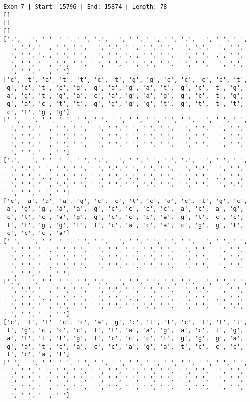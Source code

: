 \documentclass{article}
\begin{document}
\begin{Verbatim}
Exon 7 | Start: 15796 | End: 15874 | Length: 78
[]
[]
[]
['.', ' ', ' ', ' ', ' ', '.', ' ', ' ', ' ', ' ', '.', ' ', ' ', ' ', ' ', '.', ' ', ' ', ' ', ' ', '.', ' ', ' ', ' ', ' ', '.', ' ', ' ', ' ', ' ', '.', ' ', ' ', ' ', ' ', '.', ' ', ' ', ' ', ' ', '.', ' ', ' ', ' ', ' ', '.', ' ', ' ', ' ', ' ', '.', ' ', ' ', ' ', ' ', '.', ' ', ' ', ' ', ' ']
['c', 't', 'a', 't', 't', 'c', 't', 'g', 'g', 'c', 'c', 'c', 'c', 't', 'g', 'c', 't', 'c', 'g', 'g', 'a', 'g', 'a', 't', 'g', 'c', 't', 'g', 'a', 'g', 't', 'g', 'a', 'c', 'a', 'g', 'a', 'g', 'g', 'c', 't', 'g', 'g', 'a', 'c', 't', 't', 'g', 'g', 'g', 'g', 't', 'g', 't', 't', 't', 'c', 't', 'g', 'g']
[' ', ' ', ' ', ' ', ' ', ' ', ' ', ' ', ' ', ' ', ' ', ' ', ' ', ' ', ' ', ' ', ' ', ' ', ' ', ' ', ' ', ' ', ' ', ' ', ' ', ' ', ' ', ' ', ' ', ' ', ' ', ' ', ' ', ' ', ' ', ' ', ' ', ' ', ' ', ' ', ' ', ' ', ' ', ' ', ' ', ' ', ' ', ' ', ' ', ' ', ' ', ' ', ' ', ' ', ' ', ' ', ' ', ' ', ' ', ' ']
['.', ' ', ' ', ' ', ' ', '.', ' ', ' ', ' ', ' ', '.', ' ', ' ', ' ', ' ', '.', ' ', ' ', ' ', ' ', '.', ' ', ' ', ' ', ' ', '.', ' ', ' ', ' ', ' ', '.', ' ', ' ', ' ', ' ', '.', ' ', ' ', ' ', ' ', '.', ' ', ' ', ' ', ' ', '.', ' ', ' ', ' ', ' ', '.', ' ', ' ', ' ', ' ', '.', ' ', ' ', ' ', ' ']
['c', 'a', 'a', 'a', 'g', 'c', 'c', 't', 'c', 'a', 'c', 't', 'g', 'c', 'a', 'g', 'g', 'a', 'a', 'g', 'c', 'c', 'c', 'c', 'a', 'c', 'a', 'g', 'c', 't', 'c', 'a', 'g', 'g', 'c', 'c', 'c', 'a', 'g', 't', 'c', 'c', 't', 't', 'g', 'g', 't', 't', 'c', 'a', 'c', 'a', 'c', 'g', 'g', 't', 'c', 'c', 'c', 'a']
[' ', ' ', ' ', ' ', ' ', ' ', ' ', ' ', ' ', ' ', ' ', ' ', ' ', ' ', ' ', ' ', ' ', ' ', ' ', ' ', ' ', ' ', ' ', ' ', ' ', ' ', ' ', ' ', ' ', ' ', ' ', ' ', ' ', ' ', ' ', ' ', ' ', ' ', ' ', ' ', ' ', ' ', ' ', ' ', ' ', ' ', ' ', ' ', ' ', ' ', ' ', ' ', ' ', ' ', ' ', ' ', ' ', ' ', ' ', ' ']
['.', ' ', ' ', ' ', ' ', '.', ' ', ' ', ' ', ' ', '.', ' ', ' ', ' ', ' ', '.', ' ', ' ', ' ', ' ', '.', ' ', ' ', ' ', ' ', '.', ' ', ' ', ' ', ' ', '.', ' ', ' ', ' ', ' ', '.', ' ', ' ', ' ', ' ', '.', ' ', ' ', ' ', ' ', '.', ' ', ' ', ' ', ' ', '.', ' ', ' ', ' ', ' ', '.', ' ', ' ', ' ', ' ']
['c', 't', 't', 'c', 'c', 'a', 'g', 'c', 't', 't', 'c', 't', 't', 't', 't', 'g', 'c', 'c', 'c', 't', 't', 'a', 'a', 'g', 'a', 'c', 't', 'g', 'a', 't', 't', 't', 'g', 't', 'c', 'c', 'c', 't', 'g', 'g', 'g', 'a', 'g', 'a', 't', 'c', 'a', 'c', 'c', 'a', 'g', 'a', 't', 'c', 'c', 'c', 't', 'c', 'a', 't']
[' ', ' ', ' ', ' ', ' ', ' ', ' ', ' ', ' ', ' ', ' ', ' ', ' ', ' ', ' ', ' ', ' ', ' ', ' ', ' ', ' ', ' ', ' ', ' ', ' ', ' ', ' ', ' ', ' ', ' ', ' ', ' ', ' ', ' ', ' ', ' ', ' ', ' ', ' ', ' ', ' ', ' ', ' ', ' ', ' ', ' ', ' ', ' ', ' ', ' ', ' ', ' ', ' ', ' ', ' ', ' ', ' ', ' ', ' ', ' ']

\end{Verbatim}
\end{document}
